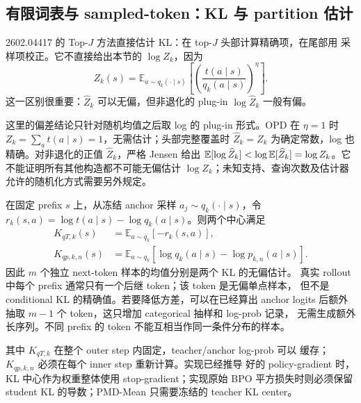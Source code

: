\subsection{有限词表与 sampled-token：KL 与 partition 估计}
\label{sec:ch2-opd-z-kl-estimation}

2602.04417 的 Top-$J$ 方法直接估计 KL：在 top-$J$ 头部计算精确项，在尾部用 采样项校正。它不直接给出本节的 $\log Z_k$，因为
\begin{equation}
Z_k(s)=\mathbb E_{a\sim q_k(\cdot\mid s)}
\left[\left(\frac{t(a\mid s)}{q_k(a\mid s)}\right)^\eta\right].
\label{eq:ch2-opd-z-importance}
\end{equation}
这一区别很重要：$\widehat Z_k$ 可以无偏，但非退化的 plug-in $\log\widehat Z_k$ 一般有偏。

这里的偏差结论只针对随机均值之后取 log 的 plug-in 形式。OPD 在 $\eta=1$ 时 $Z_k=\sum_a t(a\mid s)=1$，无需估计；头部完整覆盖时 $\widehat Z_k=Z_k$ 为确定常数，log 也精确。对非退化的正值 $\widehat Z_k$，严格 Jensen 给出 $\mathbb E[\log\widehat Z_k]<\log\mathbb E[\widehat Z_k]=\log Z_k$。它不能证明所有其他构造都不可能无偏估计 $\log Z_k$；未知支持、查询次数及估计器允许的随机化方式需要另外规定。

在固定 prefix $s$ 上，从冻结 anchor 采样 $a_j\sim q_k(\cdot\mid s)$，令 $r_k(s,a)=\log t(a\mid s)-\log q_k(a\mid s)$。则两个中心满足
\begin{align}
K_{qT,k}(s)&=\mathbb E_{a\sim q_k}[-r_k(s,a)],\\
K_{qp,k,n}(s)&=\mathbb E_{a\sim q_k}
\left[\log q_k(a\mid s)-\log p_{k,n}(a\mid s)\right].
\end{align}
因此 $m$ 个独立 next-token 样本的均值分别是两个 KL 的无偏估计。 真实 rollout 中每个 prefix 通常只有一个后继 token；该 token 是无偏单点样本， 但不是 conditional KL 的精确值。若要降低方差，可以在已经算出 anchor logits 后额外抽取 $m-1$ 个 token，这只增加 categorical 抽样和 log-prob 记录， 无需生成额外长序列。不同 prefix 的 token 不能互相当作同一条件分布的样本。

其中 $K_{qT,k}$ 在整个 outer step 内固定，teacher/anchor log-prob 可以 缓存；$K_{qp,k,n}$ 必须在每个 inner step 重新计算。实现已经推导 好的 policy-gradient 时，KL 中心作为权重整体使用 stop-gradient；实现原始 BPO 平方损失时则必须保留 student KL 的导数；PMD-Mean 只需要冻结的 teacher KL center。

